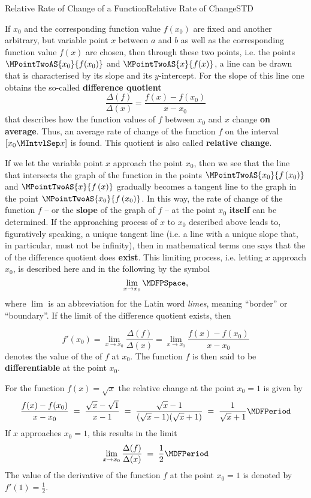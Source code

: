 \begin{MXContent}{Relative Rate of Change of a Function}{Relative Rate of Change}{STD}


If $x_0$ and the corresponding function value $f\left(x_0\right)$ are fixed and 
another arbitrary, but variable point $x$ between $a$ and $b$ as well as the 
corresponding function value $f\left(x\right)$ are chosen, then through these 
two points, i.e. the points $\MPointTwoAS{x_0}{f(x_0)}$ and $\MPointTwoAS{x}{f(x)}$, 
a line can be drawn that is characterised by its slope and its $y$-intercept. For the 
slope of this line one obtains the so-called \textbf{difference quotient}
\[
\frac{\Delta(f)}{\Delta(x)} = \frac{f(x) - f(x_0)}{x - x_0}
\]
that describes how the function values of $f$ between $x_0$ and $x$ change \textbf{on average}.
Thus, an average rate of change of the function $f$ on the interval $[x_0\MIntvlSep  x]$ is found. 
This quotient is also called \textbf{relative change}.

If we let the variable point $x$ approach the point $x_0$, then we see that the line 
that intersects the graph of the function in the points $\MPointTwoAS{x_0}{f\left(x_0\right)}$ 
and $\MPointTwoAS{x}{f\left(x\right)}$ 
gradually becomes a tangent line to the graph in the point $\MPointTwoAS{x_0}{f\left(x_0\right)}$.
In this way, the rate of change of the function $f$ -- or the \textbf{slope} of the graph of 
$f$ -- at the point $x_0$ \textbf{itself} can be determined. If the approaching process 
of $x$ to $x_0$ described above leads to, figuratively speaking, a unique tangent line (i.e. a line with 
a unique slope that, in particular, must not be infinity), then in mathematical terms
one says that the  of the difference quotient does \textbf{exist}. 
This limiting process, i.e. letting $x$ approach $x_0$, is described here and in the following 
by the symbol 
\[
\lim_{x \rightarrow x_0} \MDFPSpace,
\]
where $\lim$ is an abbreviation for the Latin word \emph{limes}, meaning ``border'' or ``boundary''.
If the limit of the difference quotient exists, then

\[
f'(x_0) = \lim_{x \rightarrow x_0} \frac{\Delta(f)}{\Delta(x)} 
 = \lim_{x \rightarrow x_0} \frac{f(x) - f(x_0)}{x - x_0} %
\] 
denotes the value of the  of $f$ at $x_0$. The function $f$ is then 
said to be \textbf{differentiable} at the point $x_0$.

\begin{MExample}
  For the function $f(x)=\sqrt{x}$ the relative change at the point $x_0=1$ is given by
  \[
    \frac{f(x) - f(x_0)}{x - x_0} \;=\;
    \frac{\sqrt{x}-\sqrt{1}}{x-1} \;=\; \frac{\sqrt{x}-1}{(\sqrt{x}-1)(\sqrt{x}+1)} \;=\; \frac1{\sqrt{x}+1} \MDFPeriod
  \]
  If $x$ approaches $x_0=1$, this results in the limit
  $$
  \lim_{x \rightarrow x_0} \frac{\Delta(f)}{\Delta(x)} \;=\; \frac12 \MDFPeriod
  $$
  The value of the derivative of the function $f$ at the point $x_0=1$ is denoted by 
  $f'(1)=\frac12$.
\end{MExample}


\end{MXContent}
